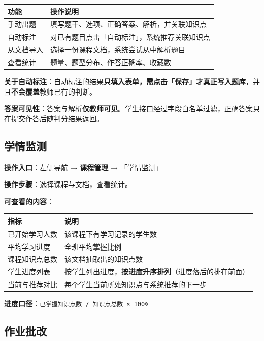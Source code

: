 \documentclass[UTF8,a4paper,11pt]{ctexrep}
\begin{document}
\begin{center}
\small
\begin{tabularx}{\linewidth}{@{}XX@{}}
\toprule
功能 & 操作说明 \\
\midrule
手动出题 & 填写题干、选项、正确答案、解析，并关联知识点 \\
自动标注 & 对已有题目点击「自动标注」，系统推荐关联知识点 \\
从文档导入 & 选择一份课程文档，系统尝试从中解析题目 \\
查看统计 & 题量、题型分布、作答正确率、收藏数 \\
\bottomrule
\end{tabularx}
\end{center}
\textbf{关于自动标注}：自动标注的结果\textbf{只填入表单，需点击「保存」才真正写入题库}，并且\textbf{不会覆盖}教师已有的判断。

\textbf{答案可见性}：答案与解析\textbf{仅教师可见}。学生接口经过字段白名单过滤，正确答案只在提交作答后随判分结果返回。


\subsection{学情监测}

\textbf{操作入口}：左侧导航 → \textbf{课程管理} → 「学情监测」

\textbf{操作步骤}：选择课程与文档，查看统计。

\textbf{可查看的内容}：

\begin{center}
\small
\begin{tabularx}{\linewidth}{@{}XX@{}}
\toprule
指标 & 说明 \\
\midrule
已开始学习人数 & 该课程下有学习记录的学生数 \\
平均学习进度 & 全班平均掌握比例 \\
课程知识点总数 & 该文档抽取出的知识点数 \\
学生进度列表 & 按学生列出进度，\textbf{按进度升序排列}（进度落后的排在前面） \\
当前与推荐对比 & 每个学生当前所处知识点与系统推荐的下一步 \\
\bottomrule
\end{tabularx}
\end{center}
\textbf{进度口径}：\texttt{已掌握知识点数 / 知识点总数 × 100\%}


\subsection{作业批改}
\end{document}
